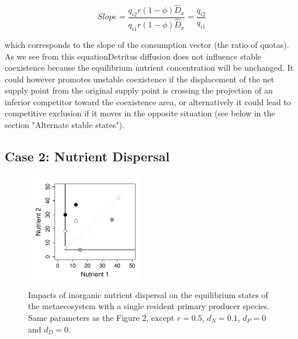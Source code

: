 \documentclass[letterpaper,twocolumn,showkeys]{revtex4-1}
\begin{document}
\begin{equation}
	\label{e:bnet}
	Slope=\frac{q_{i2}r(1-\phi) \widehat{D}_{x}}{q_{i1}r(1-\phi) \widehat{D}_{x}}=\frac{q_{i2}}{q_{i1}}
\end{equation}

which corresponds to the slope of the consumption vector (the ratio of quotas). As we see from this equationDetritus diffusion does not influence stable coexistence because the equilibrium nutrient concentration will be unchanged. It could however promotes unstable coexistence if the displacement of the net supply point from the original supply point is crossing the projection of an inferior competitor toward the coexistence area, or alternatively it could lead to competitive exclusion if it moves in the opposite situation (see below in the section "Alternate stable states"). 

\subsection{Case 2: Nutrient Dispersal}

\begin{figure}[tb]
   \centering
   \includegraphics[width=0.45\textwidth]{NutrientDiffusion.pdf}
   \caption{Impacts of inorganic nutrient dispersal on the equilibrium states of the metaecosystem with a single resident primary producer species. Same parameters as the Figure 2, except $r = 0.5$, $d_N = 0.1$, $d_P = 0$ and $d_D = 0$.}
   \label{f:Nutrients}
\end{figure}
\end{document}
